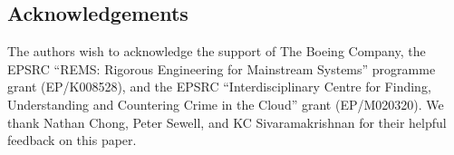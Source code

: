 \documentclass[a4paper,english]{lipics-v2018}
\newif\ifarxiv
\begin{document}
\subsection*{Acknowledgements}

The authors wish to acknowledge the support of The Boeing Company,
the EPSRC ``REMS: Rigorous Engineering for Mainstream Systems'' programme grant (EP/K008528), and
the EPSRC ``Interdisciplinary Centre for Finding, Understanding and Countering Crime in the Cloud'' grant (EP/M020320).
We thank Nathan Chong, Peter Sewell, and KC Sivaramakrishnan for their helpful feedback on this paper.


{}

\ifarxiv
\newpage
\appendix

\fi
\end{document}

